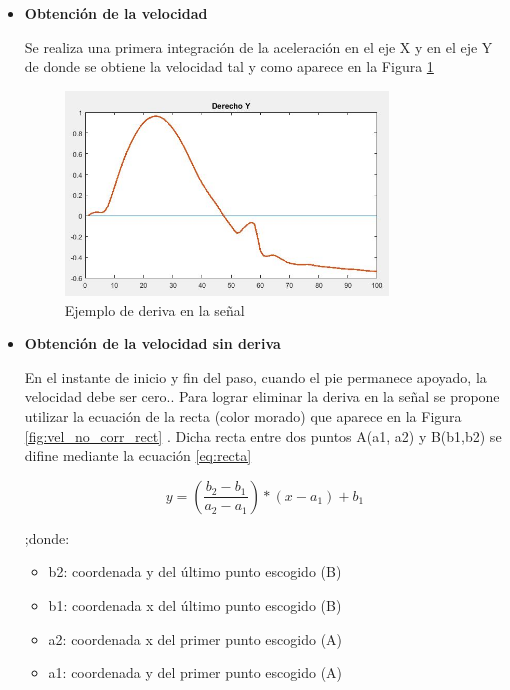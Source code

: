 \begin{itemize}
	
	\item{\textbf{Obtención de la velocidad}}
	
		Se realiza una primera integración de la aceleración en el eje X y en el eje Y de donde se obtiene la velocidad tal y como aparece en la Figura \ref{fig:vel_no_corr}
	 \begin{figure}[H]
	 	\centering
	 	\includegraphics[width=0.81\textwidth]{./graphics/vel_no_corr}
	 	\caption{Ejemplo de deriva en la señal} \label{fig:vel_no_corr}
	 	
	 \end{figure}
 
	\item{\textbf{Obtención de la velocidad sin deriva}}	
	
En el instante de inicio y fin del paso, cuando el pie permanece apoyado, la velocidad debe ser cero.. Para lograr eliminar la deriva en la señal se propone utilizar la ecuación de la recta (color morado) que aparece en la Figura  \ref{fig:vel_no_corr_rect} . Dicha recta entre dos puntos A(a1, a2) y B(b1,b2) se difine mediante la ecuación \ref{eq:recta}
	
	\begin{equation}\label{eq:recta}
	y = (\frac{b_{2}-b_{1}}{a_{2}-a_{1}})*(x-a_{1})+b_{1}
	\end{equation}
	
	;donde:
	\begin{itemize}
		\item b2: coordenada y del último punto escogido (B)
		\item b1: coordenada x del último punto escogido (B)
		\item a2: coordenada x del primer punto escogido (A)
		\item a1: coordenada y del primer punto escogido (A)


\end{itemize}
\end{itemize}

